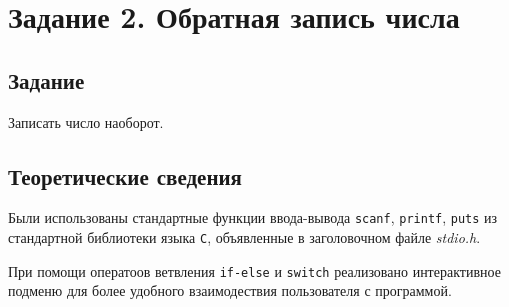 \documentclass[12pt,a4paper]{report}
\begin{document}
\section{Задание 2. Обратная запись числа}
\subsection{Задание}

\hspace{\parindent}Записать число наоборот.

\subsection{Теоретические сведения}
\hspace{\parindent}Были использованы стандартные функции ввода-вывода \texttt{scanf}, \texttt{printf}, \texttt{puts} из стандартной библиотеки языка \verb+С+, объявленные в заголовочном файле \textit{stdio.h}.

При помощи оператоов ветвления \texttt{if-else} и \texttt{switch} реализовано интерактивное подменю для более удобного взаимодествия пользователя с программой.
\end{document}
